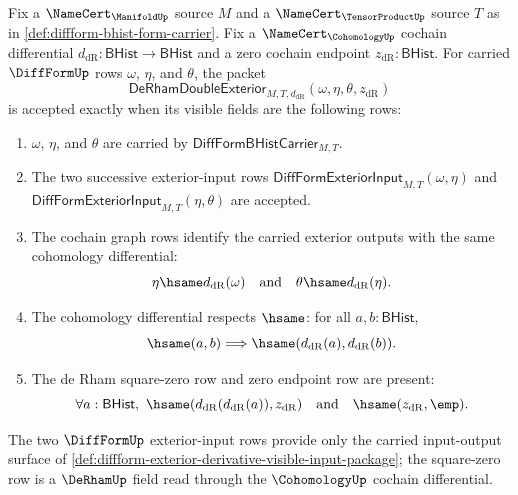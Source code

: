 \begin{definition}
\label{def:derham-double-exterior-derivative-packet}
Fix a $\NameCert_{\ManifoldUp}$ source $M$ and a
$\NameCert_{\TensorProductUp}$ source $T$ as in
\autoref{def:diffform-bhist-form-carrier}. Fix a
$\NameCert_{\CohomologyUp}$ cochain differential
$d_{\mathrm{dR}}:\mathsf{BHist}\to\mathsf{BHist}$ and a zero cochain endpoint
$z_{\mathrm{dR}}:\mathsf{BHist}$. For carried $\DiffFormUp$ rows
$\omega$, $\eta$, and $\theta$, the packet
$$
\mathsf{DeRhamDoubleExterior}_{M,T,d_{\mathrm{dR}}}
(\omega,\eta,\theta,z_{\mathrm{dR}})
$$
is accepted exactly when its visible fields are the following rows:
\begin{enumerate}
  \item $\omega$, $\eta$, and $\theta$ are carried by
  $\mathsf{DiffFormBHistCarrier}_{M,T}$.
  \item The two successive exterior-input rows
  $\mathsf{DiffFormExteriorInput}_{M,T}(\omega,\eta)$ and
  $\mathsf{DiffFormExteriorInput}_{M,T}(\eta,\theta)$ are accepted.
  \item The cochain graph rows identify the carried exterior outputs with the
  same cohomology differential:
  $$
  \eta\hsame d_{\mathrm{dR}}(\omega)
  \quad\text{and}\quad
  \theta\hsame d_{\mathrm{dR}}(\eta).
  $$
  \item The cohomology differential respects $\hsame$: for all
  $a,b:\mathsf{BHist}$,
  $$
  \hsame(a,b)\Longrightarrow
  \hsame(d_{\mathrm{dR}}(a),d_{\mathrm{dR}}(b)).
  $$
  \item The de Rham square-zero row and zero endpoint row are present:
  $$
  \forall a:\mathsf{BHist},\
  \hsame(d_{\mathrm{dR}}(d_{\mathrm{dR}}(a)),z_{\mathrm{dR}})
  \quad\text{and}\quad
  \hsame(z_{\mathrm{dR}},\emp).
  $$
\end{enumerate}
The two $\DiffFormUp$ exterior-input rows provide only the carried input-output
surface of \autoref{def:diffform-exterior-derivative-visible-input-package};
the square-zero row is a $\DeRhamUp$ field read through the
$\CohomologyUp$ cochain differential.
\end{definition}

